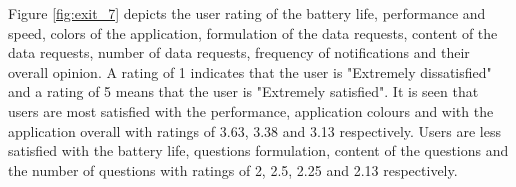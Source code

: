 Figure \ref{fig:exit_7} depicts the user rating of the battery life, performance and speed, colors of the application, formulation of the data requests, content of the data requests, number of data requests, frequency of notifications and their overall opinion. A rating of 1 indicates that the user is "Extremely dissatisfied" and a rating of 5 means that the user is "Extremely satisfied". It is seen that users are most satisfied with the performance, application colours and with the application overall with ratings of 3.63, 3.38 and 3.13 respectively. Users are less satisfied with the battery life, questions formulation, content of the questions and the number of questions with ratings of 2, 2.5, 2.25 and 2.13 respectively. 

\begin{figure}[htp]
\hspace{1em}
\newline
{}

\end{figure}
